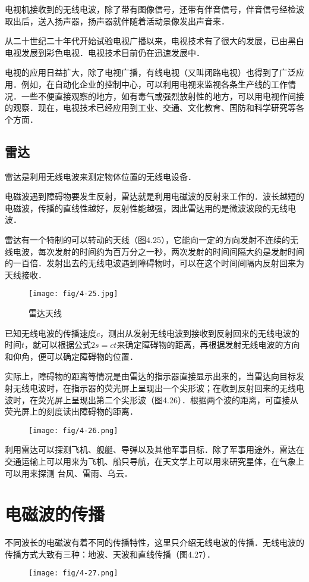 电视机接收到的无线电波，除了带有图像信号，还带有伴音信号，伴音信号经检波取出后，送入扬声器，扬声器就伴随着活动景像发出声音来．

从二十世纪二十年代开始试验电视广播以来，电视技术有了很大的发展，已由黑白电视发展到彩色电视．电视技术目前仍在迅速发展中．

电视的应用日益扩大，除了电视广播，有线电视（又叫闭路电视）也得到了广泛应用．例如，在自动化企业的控制中心，可以利用电视来监视各条生产线的工作情况．一些不便直接观察的地方，如有毒气或强烈放射性的地方，可以用电视作间接的观察．现在，电视技术已经应用到工业、交通、文化教育、国防和科学研究等各个方面．

\subsection{雷达}

雷达是利用无线电波来测定物体位置的无线电设备．

电磁波遇到障碍物要发生反射，雷达就是利用电磁波的反射来工作的．波长越短的电磁波，传播的直线性越好，反射性能越强，因此雷达用的是微波波段的无线电波．

雷达有一个特制的可以转动的天线（图4.25），它能向一定的方向发射不连续的无线电波，每次发射的时间约为百万分之一秒，两次发射的时间间隔大约是发射时间的一百倍．发射出去的无线电波遇到障碍物时，可以在这个时间间隔内反射回来为天线接收．
\begin{figure}[htp]\centering
	\texttt{[image: fig/4-25.jpg]}
	\caption{雷达天线}
	\end{figure}

已知无线电波的传播速度$c$，测出从发射无线电波到接收到反射回来的无线电波的时间$t$，就可以根据公式$2s=ct$来确定障碍物的距离，再根据发射无线电波的方向和仰角，便可以确定障碍物的位置．

实际上，障碍物的距离等情况是由雷达的指示器直接显示出来的，当雷达向目标发射无线电波时，在指示器的荧光屏上呈现出一个尖形波；在收到反射回来的无线电波时，在荧光屏上呈现出第二个尖形波（图4.26）．根据两个波的距离，可直接从荧光屏上的刻度读出障碍物的距离．
\begin{figure}[htp]\centering
	\texttt{[image: fig/4-26.png]}
	\caption{}
	\end{figure}

利用雷达可以探测飞机、舰艇、导弹以及其他军事目标．除了军事用途外，雷达在交通运输上可以用来为飞机、船只导航，在天文学上可以用来研究星体，在气象上可以用来探测
台风、雷雨、乌云．

\section{电磁波的传播}
不同波长的电磁波有着不同的传播特性，这里只介绍无线电波的传播．无线电波的传播方式大致有三种：地波、天波和直线传播（图4.27）．
\begin{figure}[htp]\centering
	\texttt{[image: fig/4-27.png]}
	\caption{}
	\end{figure}

